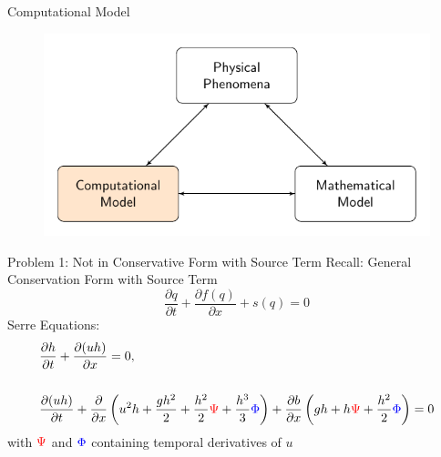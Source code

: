 \documentclass[pdf]{beamer}
\begin{document}
\begin{frame}{Computational Model}
	\begin{figure}
		\includegraphics[width=\textwidth]{./Pics/ModelDiagrams/FlowChartHigh3O.pdf}
	\end{figure}
\end{frame}
\begin{frame}{Problem 1: Not in Conservative Form with Source Term}
	Recall:
	General Conservation Form with Source Term
	\begin{equation}
	\frac{\partial q}{\partial t} + \frac{\partial f(q)}{\partial x} + s(q) = 0
	\end{equation}
	Serre Equations:
	\begin{subequations}
		\begin{align*}
		&\frac{\partial h}{\partial t} + \dfrac{\partial (uh)}{\partial x} = 0,  \\ \\
		&\dfrac{\partial (uh)}{\partial t} + \dfrac{\partial}{\partial x} \left ( u^2h + \dfrac{gh^2}{2} + \dfrac{h^2}{2}{ \color{red}\Psi } + \dfrac{h^3}{3}{ { \color{blue} \Phi } }  \right )  +  \dfrac{\partial b}{\partial x} \left (gh +   h { \color{red}\Psi } + \dfrac{h^2}{2}{ { \color{blue} \Phi } }  \right ) = 0
		\end{align*}
	\end{subequations}
	with ${ \color{red}\Psi } $ and ${ \color{blue} \Phi } $ containing temporal derivatives of $u$
	
\end{frame}
\end{document}
